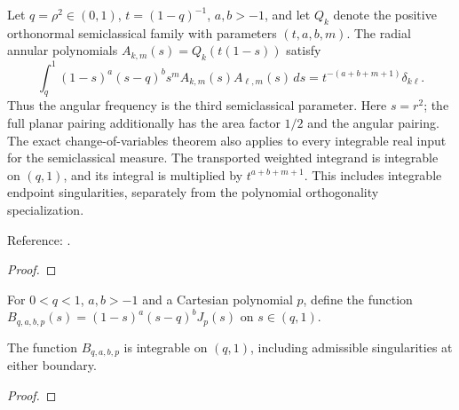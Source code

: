 \begin{theorem}
\label{thm:zernike-annulus-radial}
\leanok
Let $q=\rho^2\in(0,1)$, $t=(1-q)^{-1}$, $a,b>-1$, and let $Q_k$ denote
the positive orthonormal semiclassical family with parameters $(t,a,b,m)$.
The radial annular polynomials $A_{k,m}(s)=Q_k(t(1-s))$ satisfy
\[
 \int_q^1(1-s)^a(s-q)^b s^m A_{k,m}(s)A_{\ell,m}(s)\,ds
 = t^{-(a+b+m+1)}\delta_{k\ell}.
\]
Thus the angular frequency is the third semiclassical parameter. Here $s=r^2$;
the full planar pairing additionally has the area factor $1/2$ and the angular
pairing. The exact change-of-variables theorem also applies to every integrable real
input for the semiclassical measure. The transported weighted integrand is
integrable on $(q,1)$, and its integral is multiplied by $t^{a+b+m+1}$.
This includes integrable endpoint singularities, separately from the polynomial
orthogonality specialization.

Reference: \cite[Section 4]{pgso}.
\end{theorem}
\begin{proof}
\leanok
\end{proof}

\begin{supporting}
\begin{definition}
\label{def:zernike-annulus-radial-input}
\leanok
For $0<q<1$, $a,b>-1$ and a Cartesian polynomial $p$, define the function $B_{q,a,b,p}(s)=(1-s)^a(s-q)^bJ_p(s)$ on $s\in(q,1)$.
\end{definition}

\begin{theorem}
\label{thm:zernike-annulus-radial-input}
\leanok
The function $B_{q,a,b,p}$ is integrable on $(q,1)$, including admissible singularities at either boundary.
\end{theorem}
\begin{proof}
\leanok
\end{proof}
\end{supporting}


